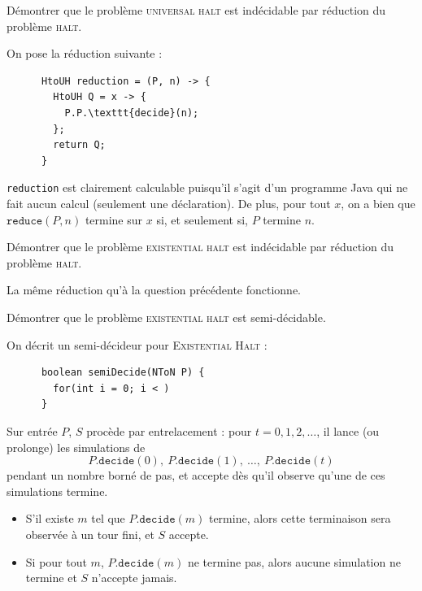 \begin{exercice}
  \begin{questions}
  \item Démontrer que le problème \textsc{universal halt} est indécidable par réduction du problème \textsc{halt}.
  \end{questions}
  \begin{corrections}
    On pose la réduction suivante :
    \begin{lstlisting}
      HtoUH reduction = (P, n) -> {
        HtoUH Q = x -> {
          P.P.\texttt{decide}(n);
        };
        return Q;
      }
    \end{lstlisting}
    \texttt{reduction} est clairement calculable puisqu'il s'agit d'un programme Java qui ne fait aucun calcul (seulement une déclaration).
    De plus, pour tout $x$, on a bien que $\texttt{reduce}(P, n)$ termine sur $x$ si, et seulement si, $P$ termine $n$.
  \end{corrections}

  \begin{questions}
  \item Démontrer que le problème \textsc{existential halt} est indécidable par réduction du problème \textsc{halt}.
  \end{questions}
  \begin{corrections}
    La même réduction qu'à la question précédente fonctionne.
  \end{corrections}

  \begin{questions}
  \item Démontrer que le problème \textsc{existential halt} est semi-décidable.
  \end{questions}
  \begin{corrections}
    On décrit un semi-décideur pour \textsc{Existential Halt} :
    
    \begin{lstlisting}
      boolean semiDecide(NToN P) {
        for(int i = 0; i < )
      }
    \end{lstlisting}
    

    

    Sur entrée $P$, $S$ procède par entrelacement :
    pour $t=0,1,2,\dots$, il lance (ou prolonge) les simulations de
    \[
    P.\texttt{decide}(0),\ P.\texttt{decide}(1),\ \dots,\ P.\texttt{decide}(t)
    \]
    pendant un nombre borné de pas, et accepte dès qu'il observe qu'une de ces simulations termine.

    \begin{itemize}
    \item S'il existe $m$ tel que $P.\texttt{decide}(m)$ termine, alors cette terminaison sera observée à un tour fini, et $S$ accepte.
    \item Si pour tout $m$, $P.\texttt{decide}(m)$ ne termine pas, alors aucune simulation ne termine et $S$ n'accepte jamais.
    \end{itemize}
  \end{corrections}


\end{exercice}
